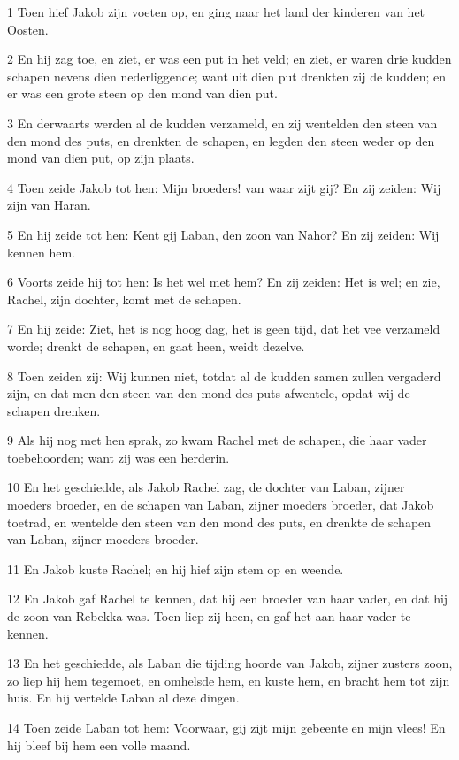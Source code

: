 \par 1 Toen hief Jakob zijn voeten op, en ging naar het land der kinderen van het Oosten.
\par 2 En hij zag toe, en ziet, er was een put in het veld; en ziet, er waren drie kudden schapen nevens dien nederliggende; want uit dien put drenkten zij de kudden; en er was een grote steen op den mond van dien put.
\par 3 En derwaarts werden al de kudden verzameld, en zij wentelden den steen van den mond des puts, en drenkten de schapen, en legden den steen weder op den mond van dien put, op zijn plaats.
\par 4 Toen zeide Jakob tot hen: Mijn broeders! van waar zijt gij? En zij zeiden: Wij zijn van Haran.
\par 5 En hij zeide tot hen: Kent gij Laban, den zoon van Nahor? En zij zeiden: Wij kennen hem.
\par 6 Voorts zeide hij tot hen: Is het wel met hem? En zij zeiden: Het is wel; en zie, Rachel, zijn dochter, komt met de schapen.
\par 7 En hij zeide: Ziet, het is nog hoog dag, het is geen tijd, dat het vee verzameld worde; drenkt de schapen, en gaat heen, weidt dezelve.
\par 8 Toen zeiden zij: Wij kunnen niet, totdat al de kudden samen zullen vergaderd zijn, en dat men den steen van den mond des puts afwentele, opdat wij de schapen drenken.
\par 9 Als hij nog met hen sprak, zo kwam Rachel met de schapen, die haar vader toebehoorden; want zij was een herderin.
\par 10 En het geschiedde, als Jakob Rachel zag, de dochter van Laban, zijner moeders broeder, en de schapen van Laban, zijner moeders broeder, dat Jakob toetrad, en wentelde den steen van den mond des puts, en drenkte de schapen van Laban, zijner moeders broeder.
\par 11 En Jakob kuste Rachel; en hij hief zijn stem op en weende.
\par 12 En Jakob gaf Rachel te kennen, dat hij een broeder van haar vader, en dat hij de zoon van Rebekka was. Toen liep zij heen, en gaf het aan haar vader te kennen.
\par 13 En het geschiedde, als Laban die tijding hoorde van Jakob, zijner zusters zoon, zo liep hij hem tegemoet, en omhelsde hem, en kuste hem, en bracht hem tot zijn huis. En hij vertelde Laban al deze dingen.
\par 14 Toen zeide Laban tot hem: Voorwaar, gij zijt mijn gebeente en mijn vlees! En hij bleef bij hem een volle maand.
